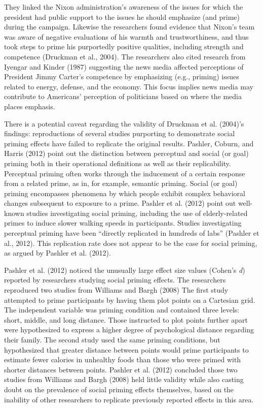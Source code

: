 \documentclass[english,,man]{apa6}
\begin{document}
They linked the Nixon administration's awareness of the issues for which
the president had public support to the issues he should emphasize (and
prime) during the campaign. Likewise the researchers found evidence that
Nixon's team was aware of negative evaluations of his warmth and
trustworthiness, and thus took steps to prime his purportedly positive
qualities, including strength and competence (Druckman et al., 2004).
The researchers also cited research from Iyengar and Kinder (1987)
suggesting the news media affected perceptions of President Jimmy
Carter's competence by emphasizing (e.g., priming) issues related to
energy, defense, and the economy. This focus implies news media may
contribute to Americans' perception of politicians based on where the
media places emphasis.

There is a potential caveat regarding the validity of Druckman et al.
(2004)'s findings: reproductions of several studies purporting to
demonstrate social priming effects have failed to replicate the original
results. Pashler, Coburn, and Harris (2012) point out the distinction
between perceptual and social (or goal) priming both in their
operational definitions as well as their replicability. Perceptual
priming often works through the inducement of a certain response from a
related prime, as in, for example, semantic priming. Social (or goal)
priming encompasses phenomena by which people exhibit complex behavioral
changes subsequent to exposure to a prime. Pashler et al. (2012) point
out well-known studies investigating social priming, including the use
of elderly-related primes to induce slower walking speeds in
participants. Studies investigating perceptual priming have been
\enquote{directly replicated in hundreds of labs} (Pashler et al.,
2012). This replication rate does not appear to be the case for social
priming, as argued by Pashler et al. (2012).

Pashler et al. (2012) noticed the unusually large effect size values
(Cohen's \emph{d}) reported by researchers studying social priming
effects. The researchers reproduced two studies from Williams and Bargh
(2008) The first study attempted to prime participants by having them
plot points on a Cartesian grid. The independent variable was priming
condition and contained three levels: short, middle, and long distance.
Those instructed to plot points further apart were hypothesized to
express a higher degree of psychological distance regarding their
family. The second study used the same priming conditions, but
hypothesized that greater distance between points would prime
participants to estimate fewer calories in unhealthy foods than those
who were primed with shorter distances between points. Pashler et al.
(2012) concluded those two studies from Williams and Bargh (2008) held
little validity while also casting doubt on the prevalence of social
priming effects themselves, based on the inability of other researchers
to replicate previously reported effects in this area.
\end{document}
